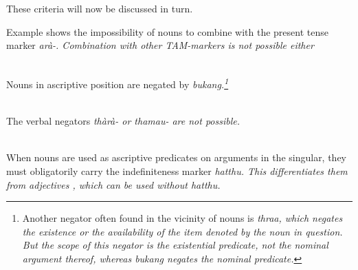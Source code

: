 These criteria will now be discussed in turn.

Example  shows the impossibility of nouns to combine with the present tense marker \em arà-\em. Combination with other TAM-markers is not possible either

\\



Nouns in ascriptive position are negated by \em bukang\em.\footnote{Another negator often found in the vicinity of nouns is \em thraa\em, which negates the existence or the availability of the item denoted by the noun in question. But the scope of this negator is the existential predicate, not the nominal argument thereof, whereas \em bukang \em negates the nominal predicate.}


 \\

The verbal negators \em thàrà- \em or \em thamau- \em are not possible.

\\

When nouns are used as ascriptive predicates on arguments in the singular, they must obligatorily carry the indefiniteness marker \em hatthu.\em{} This differentiates them from adjectives , which can be used without \em hatthu\em.

